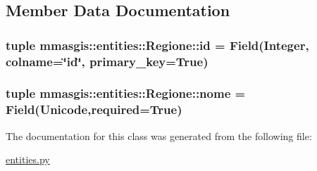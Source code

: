 \subsection{Member Data Documentation}
\hypertarget{classmmasgis_1_1entities_1_1Regione_af2dc3954f70d5570e7deaeba108744af}{
\subsubsection[{id}]{\setlength{\rightskip}{0pt plus 5cm}tuple {\bf mmasgis::entities::Regione::id} = Field(Integer, colname=\char`\"{}id\char`\"{}, primary\_\-key=True)}}
\label{classmmasgis_1_1entities_1_1Regione_af2dc3954f70d5570e7deaeba108744af}
\hypertarget{classmmasgis_1_1entities_1_1Regione_adf21403156128360c8ccde008cf8c624}{
\subsubsection[{nome}]{\setlength{\rightskip}{0pt plus 5cm}tuple {\bf mmasgis::entities::Regione::nome} = Field(Unicode,required=True)}}
\label{classmmasgis_1_1entities_1_1Regione_adf21403156128360c8ccde008cf8c624}


The documentation for this class was generated from the following file:\begin{DoxyCompactItemize}
\item 
\hyperlink{entities_8py}{entities.py}\end{DoxyCompactItemize}
